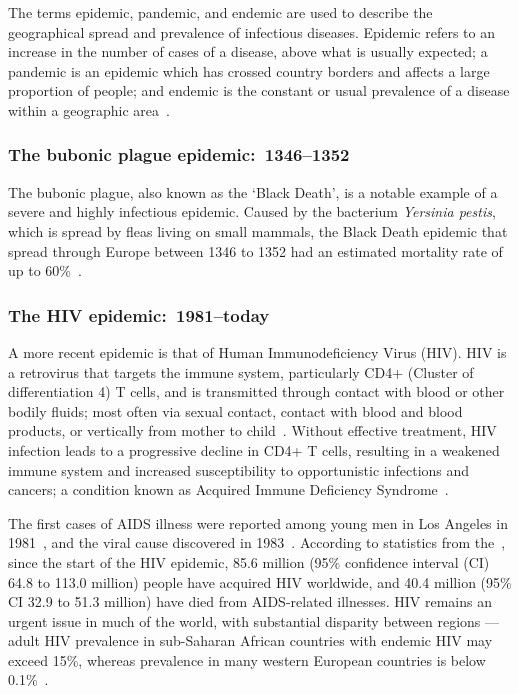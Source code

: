 The terms epidemic, pandemic, and endemic are used to describe the geographical spread and prevalence of infectious diseases. Epidemic refers to an increase in the number of cases of a disease, above what is usually expected; a pandemic is an epidemic which has crossed country borders and affects a large proportion of people; and endemic is the constant or usual prevalence of a disease within a geographic area~\parencite{van-Seventer2017-rt}.

\subsubsection{The bubonic plague epidemic:\ 1346--1352}

The bubonic plague, also known as the `Black Death', is a notable example of a severe and highly infectious epidemic. Caused by the bacterium \textit{Yersinia pestis}, which is spread by fleas living on small mammals, the Black Death epidemic that spread through Europe between 1346 to 1352 had an estimated mortality rate of up to 60\%~\parencite{Benedictow2004-nc}.

\subsubsection{The HIV epidemic:\ 1981--today}

A more recent epidemic is that of Human Immunodeficiency Virus (HIV)\@. HIV is a retrovirus that targets the immune system, particularly CD4+ (Cluster of differentiation 4) T cells, and is transmitted through contact with blood or other bodily fluids; most often via sexual contact, contact with blood and blood products, or vertically from mother to child~\parencite{Delpech2022-af}. Without effective treatment, HIV infection leads to a progressive decline in CD4+ T cells, resulting in a weakened immune system and increased susceptibility to opportunistic infections and cancers; a condition known as Acquired Immune Deficiency Syndrome~\parencite{Lipman2006-xd}.

The first cases of AIDS illness were reported among young men in Los Angeles in 1981~\parencite{The_Lancet2021-sq}, and the viral cause discovered in 1983~\parencite{Gallo1984-ci, Barre-Sinoussi1983-mt}. According to statistics from the~\cite{Joint_United_Nations_Programme_on_HIVAIDS_UNAIDS2023-sl}, since the start of the HIV epidemic, 85.6 million (95\% confidence interval (CI) 64.8 to 113.0 million) people have acquired HIV worldwide, and 40.4 million (95\% CI 32.9 to 51.3 million) have died from AIDS-related illnesses. HIV remains an urgent issue in much of the world, with substantial disparity between regions --- adult HIV prevalence in sub-Saharan African countries with endemic HIV may exceed 15\%, whereas prevalence in many western European countries is below 0.1\%~\parencite{Joint_United_Nations_Programme_on_HIVAIDS_UNAIDS2023-ht}.

